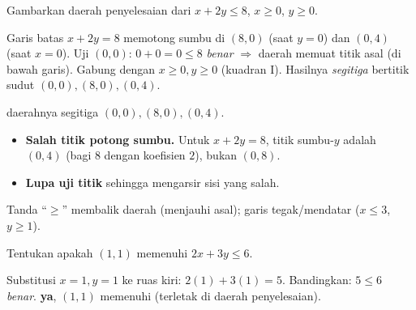 \begin{soalbox}{}
Gambarkan daerah penyelesaian dari $x+2y\le8$, $x\ge0$, $y\ge0$.
\end{soalbox}

\jawab
{} Garis batas $x+2y=8$ memotong sumbu di $(8,0)$ (saat $y=0$) dan
$(0,4)$ (saat $x=0$).
 Uji $(0,0)$: $0+0=0\le8$ \emph{benar} $\Rightarrow$ daerah memuat
titik asal (di bawah garis).
 Gabung dengan $x\ge0,y\ge0$ (kuadran I). Hasilnya \emph{segitiga}
bertitik sudut $(0,0),(8,0),(0,4)$.

\begin{center}
\end{center}
\jadi daerahnya segitiga $(0,0),(8,0),(0,4)$.

\begin{jebakan}
\begin{itemize}[leftmargin=*,topsep=2pt]
  \item \textbf{Salah titik potong sumbu.} Untuk $x+2y=8$, titik sumbu-$y$
  adalah $(0,4)$ (bagi $8$ dengan koefisien $2$), bukan $(0,8)$.
  \item \textbf{Lupa uji titik} sehingga mengarsir sisi yang salah.
\end{itemize}
\end{jebakan}

\begin{variasi}
Tanda ``$\ge$'' membalik daerah (menjauhi asal); garis tegak/mendatar
($x\le3$, $y\ge1$).
\end{variasi}

\begin{soalbox}{}
Tentukan apakah $(1,1)$ memenuhi $2x+3y\le6$.
\end{soalbox}

\jawab
{} Substitusi $x=1,y=1$ ke ruas kiri: $2(1)+3(1)=5$.
 Bandingkan: $5\le6$ \emph{benar}.
\jadi \textbf{ya}, $(1,1)$ memenuhi (terletak di daerah penyelesaian).

